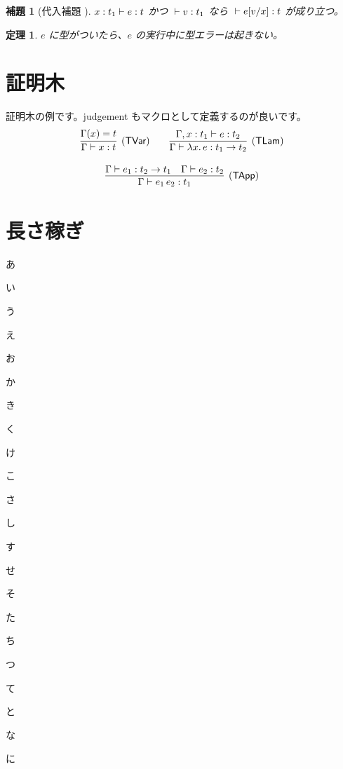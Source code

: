 \documentclass[twoside, twocolumn, a4paper]{jarticle}
\newtheorem{lemma}[definition]{補題}
\newtheorem{theorem}[definition]{定理}
\begin{document}
\begin{lemma}[代入補題 \cite{WF1994}]
${x:t_1}\vdash{e}:{t}$ かつ ${}\vdash{v}:{t_1}$ なら
${}\vdash{e[v/x]}:{t}$ が成り立つ。
\end{lemma}

\begin{theorem}
$e$ に型がついたら、$e$ の実行中に型エラーは起きない。
\end{theorem}

\section{証明木}\label{sec:proof}
証明木の例です。judgement もマクロとして定義するのが良いです。
\[
\begin{array}{c}
\infer[(\textsf{TVar})]
      {\Judge{\Gamma}{x}{t}}
      {\Gamma(x)=t}
\qquad
\infer[(\textsf{TLam})]
      {\Judge{\Gamma}{\Lam{x}{e}}{\Arrow{t_1}{t_2}}}
      {\Judge{\Gamma,x:t_1}{e}{t_2}} \\
\ \\
\infer[(\textsf{TApp})]
      {\Judge{\Gamma}{\App{e_1}{e_2}}{t_1}}
      {\Judge{\Gamma}{e_1}{\Arrow{t_2}{t_1}}
      &\Judge{\Gamma}{e_2}{t_2}} \\
\end{array}
\]

\section{長さ稼ぎ}
あ

い

う

え

お

か

き

く

け

こ

さ

し

す

せ

そ

た

ち

つ

て

と

な

に
\end{document}
